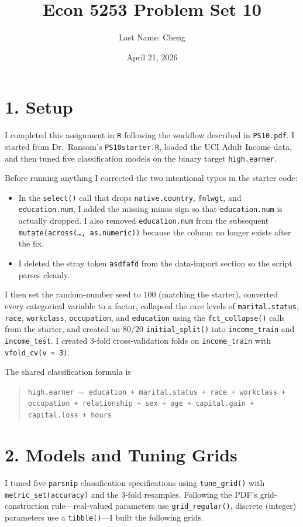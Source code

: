 \documentclass[11pt]{article}
\title{Econ 5253 Problem Set 10}
\author{Last Name: Cheng}
\date{April 21, 2026}
\begin{document}
\maketitle

\section*{1. Setup}
I completed this assignment in \texttt{R} following the workflow described in \texttt{PS10.pdf}.
I started from Dr.\ Ransom's \texttt{PS10starter.R}, loaded the UCI Adult Income data, and then tuned five classification models on the binary target \texttt{high.earner}.

Before running anything I corrected the two intentional typos in the starter code:
\begin{itemize}
\item In the \texttt{select()} call that drops \texttt{native.country}, \texttt{fnlwgt}, and \texttt{education.num}, I added the missing minus sign so that \texttt{education.num} is actually dropped. I also removed \texttt{education.num} from the subsequent \texttt{mutate(across(\ldots, as.numeric))} because the column no longer exists after the fix.
\item I deleted the stray token \texttt{asdfafd} from the data-import section so the script parses cleanly.
\end{itemize}

I then set the random-number seed to \(100\) (matching the starter), converted every categorical variable to a factor, collapsed the rare levels of \texttt{marital.status}, \texttt{race}, \texttt{workclass}, \texttt{occupation}, and \texttt{education} using the \texttt{fct\_collapse()} calls from the starter, and created an 80/20 \texttt{initial\_split()} into \texttt{income\_train} and \texttt{income\_test}.
I created 3-fold cross-validation folds on \texttt{income\_train} with \texttt{vfold\_cv(v = 3)}.

The shared classification formula is
\begin{quote}
\texttt{high.earner $\sim$ education + marital.status + race + workclass + occupation + relationship + sex + age + capital.gain + capital.loss + hours}
\end{quote}

\section*{2. Models and Tuning Grids}
I tuned five \texttt{parsnip} classification specifications using \texttt{tune\_grid()} with \texttt{metric\_set(accuracy)} and the 3-fold resamples.
Following the PDF's grid-construction rule---real-valued parameters use \texttt{grid\_regular()}, discrete (integer) parameters use a \texttt{tibble()}---I built the following grids.
\end{document}
